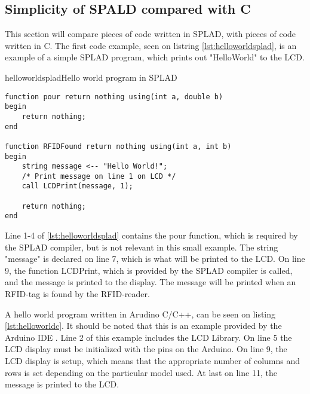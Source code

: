 \subsection{Simplicity of SPALD compared with C}
This section will compare pieces of code written in SPLAD, with pieces of code written in C. The first code example, seen on listring \ref{lst:helloworldsplad}, is an example of a simple SPLAD program, which prints out "HelloWorld" to the LCD.

\begin{code}{helloworldsplad}{Hello world program in SPLAD}
\begin{lstlisting}
function pour return nothing using(int a, double b)
begin
	return nothing;
end

function RFIDFound return nothing using(int a, int b)
begin
	string message <-- "Hello World!";
	/* Print message on line 1 on LCD */
	call LCDPrint(message, 1);

	return nothing;
end
\end{lstlisting}
\end{code}

Line 1-4 of \ref{lst:helloworldsplad} contains the pour function, which is required by the SPLAD compiler, but is not relevant in this small example. The string "message" is declared on line 7, which is what will be printed to the LCD. On line 9, the function LCDPrint, which is provided by the SPLAD compiler is called, and the message is printed to the display. The message will be printed when an RFID-tag is found by the RFID-reader.

A hello world program written in Arudino C/C++, can be seen on listing \ref{lst:helloworldc}. It should be noted that this is an example provided by the Arduino IDE \citep{LCDtut}. Line 2 of this example includes the LCD Library. On line 5 the LCD display must be initialized with the pins on the Arduino. On line 9, the LCD display is setup, which means that the appropriate number of columns and rows is set depending on the particular model used. At last on line 11, the message is printed to the LCD.
 
